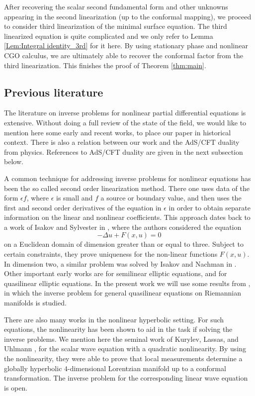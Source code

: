 \documentclass[12pt]{amsart}
\theoremstyle{definition}
\theoremstyle{remark}
\newcommand{\eps}{\epsilon}
\begin{document}
After recovering the scalar second fundamental form and other unknowns appearing in the second linearization (up to the conformal mapping), we proceed to consider third linearization of the minimal surface equation. The third linearized equation is quite complicated and we only refer to Lemma \ref{Lem:Integral identity_3rd} for it here. By using stationary phase and nonlinear CGO calculus, we are ultimately able to recover the conformal factor from the third linearization. This finishes the proof of Theorem \ref{thm:main}.



\subsection{Previous literature}
The literature on inverse problems for nonlinear partial differential equations is extensive. Without doing a full review of the state of the field, we would like to mention here some early and recent works, to place our paper in historical context.
There is also a relation between our work and the AdS/CFT duality from physics. References to AdS/CFT duality are given in the next subsection below. 

A common technique for addressing inverse problems for nonlinear equations has been the so called second order linearization method. There one uses data of the form $\epsilon f$, where $\eps$ is small and $f$ a source or boundary value, and then uses the first and second order derivatives of the equation in $\epsilon$ in order to obtain separate information on the linear and nonlinear coefficients. This approach dates back to a work of Isakov and Sylvester in \cite{isakov1994global}, where the authors considered the equation
\[
-\Delta u +F(x,u)=0 
\]
on a Euclidean domain of dimension greater than or equal to three. Subject to certain constraints, they prove uniqueness for the non-linear functions $F(x,u)$. In dimension two, a similar problem was solved by Isakov and Nachman in \cite{victorN}.
Other important early works are \cite{sun2004inverse, sun2010inverse} for semilinear elliptic equations, and \cite{sun1996,sun1997inverse} for quasilinear elliptic equations. In the present work we will use some results from \cite{lassas2018poisson}, in which the inverse problem for general quasilinear equations on Riemannian manifolds is studied.

There are also many works in the nonlinear hyperbolic setting. For such equations, the nonlinearity has been shown to aid in the task if solving the inverse problems. We mention here the seminal work of Kurylev, Lassas, and Uhlmann \cite{kurylev2018inverse}, for the scalar wave equation with a quadratic nonlinearity. By using the nonlinearity, they were able to prove that local measurements determine a globally hyperbolic $4$-dimensional Lorentzian manifold up to a conformal transformation. The inverse problem for the corresponding linear wave equation is open. 
\end{document}
